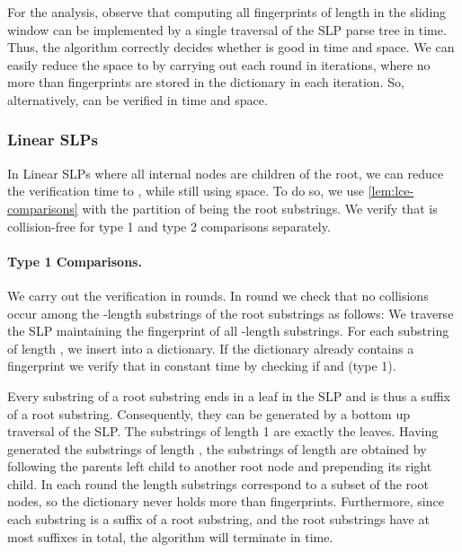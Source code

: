 \documentclass[11pt]{article}
\begin{document}
For the analysis, observe that computing all fingerprints of length  in the sliding window can be implemented by a single traversal of the SLP parse tree in  time. Thus, the algorithm correctly decides whether  is good in  time and  space. We can easily reduce the space to  by carrying out each round in  iterations, where no more than  fingerprints are stored in the dictionary in each iteration. So, alternatively,  can be verified in  time and  space.

\subsubsection{Linear SLPs} In Linear SLPs where all internal nodes are children of the root, we can reduce the verification time to , while still using  space. To do so, we use \autoref{lem:lce-comparisons} with the partition of  being the root substrings. We verify that  is collision-free for type 1 and type 2 comparisons separately.


\paragraph{Type 1 Comparisons.}
We carry out the verification in rounds. In round  we check that no collisions occur among the -length substrings of the root substrings as follows: We traverse the SLP maintaining the fingerprint of all -length substrings. For each substring  of length , we insert  into a dictionary. If the dictionary already contains a fingerprint  we verify that  in constant time by checking if  and  (type 1).

Every substring of a root substring ends in a leaf in the SLP and is thus a suffix of a root substring. Consequently, they can be generated by a bottom up traversal of the SLP. The substrings of length 1 are exactly the leaves. Having generated the substrings of length , the substrings of length  are obtained by following the parents left child to another root node and prepending its right child. In each round the  length substrings correspond to a subset of the root nodes, so the dictionary never holds more than  fingerprints. Furthermore, since each substring is a suffix of a root substring, and the root substrings have at most  suffixes in total, the algorithm will terminate in  time.
\end{document}
